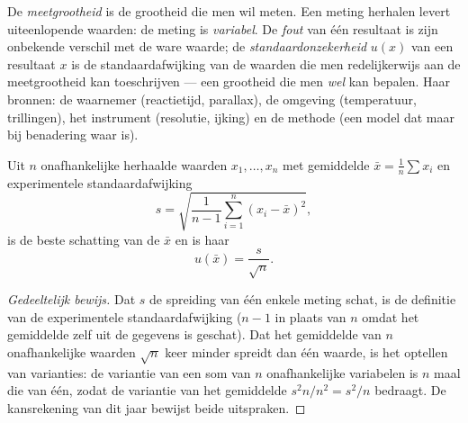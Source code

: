 \begin{definition}\label{def:b1:units-dimensions:uncertainty}
De \emph{meetgrootheid} is de grootheid die men wil meten. Een meting
herhalen levert uiteenlopende waarden: de meting is \emph{variabel}. De
\emph{fout} van één resultaat is zijn onbekende verschil met de ware waarde;
de \emph{standaardonzekerheid} $u(x)$ van een resultaat $x$ is de
standaardafwijking van de waarden die men redelijkerwijs aan de meetgrootheid
kan toeschrijven --- een grootheid die men \emph{wel} kan bepalen. Haar
bronnen: de waarnemer (reactietijd, parallax), de omgeving (temperatuur,
trillingen), het instrument (resolutie, ijking) en de methode (een model dat
maar bij benadering waar is).
\end{definition}

\begin{proposition}\label{prop:b1:units-dimensions:typeA}
Uit $n$ onafhankelijke herhaalde waarden $x_1, \dots, x_n$ met gemiddelde
$\bar x = \frac1n \sum x_i$ en experimentele standaardafwijking
\[
s = \sqrt{\frac{1}{n-1}\sum_{i=1}^n (x_i - \bar x)^2},
\]
is de beste schatting van de  $\bar x$ en is haar
\[
u(\bar x) = \frac{s}{\sqrt n} .
\]
\end{proposition}

\begin{proof}[Gedeeltelijk bewijs]
Dat $s$ de spreiding van één enkele meting schat, is de definitie van de
experimentele standaardafwijking ($n - 1$ in plaats van $n$ omdat het
gemiddelde zelf uit de gegevens is geschat). Dat het gemiddelde van $n$
onafhankelijke waarden $\sqrt n$ keer minder spreidt dan één waarde, is het
optellen van varianties: de variantie van een som van $n$ onafhankelijke
variabelen is $n$ maal die van één, zodat de variantie van het gemiddelde
$s^2 n / n^2 = s^2/n$ bedraagt. De kansrekening van dit jaar bewijst beide
uitspraken.
\end{proof}


